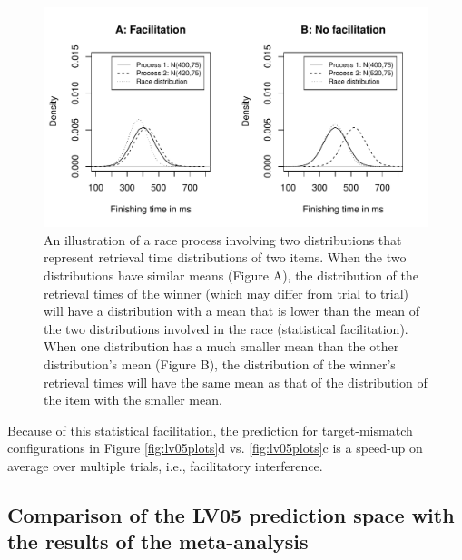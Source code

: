 \documentclass{cambridge7A}\usepackage[]{graphicx}\usepackage[]{color}
\begin{document}
\begin{figure}[!htbp]
\centering
\includegraphics[width=.9\textwidth]{figures/fig-raceproc1}
\caption{An illustration of a race process involving two distributions that represent retrieval time distributions of two items. When the two distributions have similar means (Figure A), the distribution of the retrieval times of the winner (which may differ from trial to trial) will have a distribution with a mean that is lower than the mean of the two distributions involved in the race (statistical facilitation). When one distribution has a much smaller mean than the other distribution's mean (Figure B), the distribution of the winner's retrieval times will have the same mean as that of the distribution of the item with the smaller mean.}\label{fig:raceproc}
\end{figure}

Because of this statistical facilitation, the prediction for target-mismatch configurations in Figure \ref{fig:lv05plots}d vs. \ref{fig:lv05plots}c is a speed-up on average over multiple trials, i.e.,  facilitatory interference.

\subsection{Comparison of the LV05 prediction space with the results of the meta-analysis}
\end{document}
